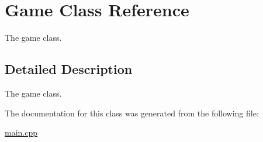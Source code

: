 \hypertarget{class_game}{}\section{Game Class Reference}
\label{class_game}


The game class.  




\subsection{Detailed Description}
The game class. 

The documentation for this class was generated from the following file\+:\begin{DoxyCompactItemize}
\item 
\hyperlink{main_8cpp}{main.\+cpp}\end{DoxyCompactItemize}
